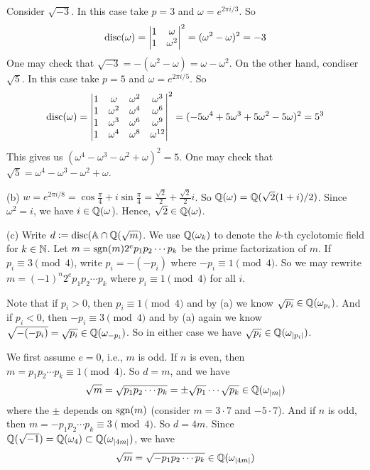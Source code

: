 \documentclass[../Marcus.tex]{subfiles}
\begin{document}
Consider $\sqrt{-3}$. In this case take $p=3$ and $\omega=e^{2\pi i/3}$. So
$$
\operatorname{disc}(\omega)=
\begin{vmatrix}
    1 & \omega \\
    1 & \omega^2
\end{vmatrix}^2
=(\omega^2-\omega)^2=-3
$$
One may check that $\sqrt{-3}=-(\omega^2-\omega)=\omega-\omega^2$.
On the other hand, condiser $\sqrt{5}$. In this case take $p=5$ and $\omega=e^{2\pi i/5}$. So
$$\operatorname{disc}(\omega)=
\begin{vmatrix}
    1 & \omega & \omega^2 & \omega^3 \\
    1 & \omega^2 & \omega^4 & \omega^6 \\
    1 & \omega^3 & \omega^6 & \omega^9 \\
    1 & \omega^4 & \omega^8 & \omega^{12} 
\end{vmatrix}^2
=(-5\omega^4+5\omega^3+5\omega^2-5\omega)^2=5^3
$$
This gives us $(\omega^4-\omega^3-\omega^2+\omega)^2=5$. One may check that $\sqrt{5}=\omega^4-\omega^3-\omega^2+\omega$.

(b) $w=e^{2\pi i/8}=\cos\frac{\pi}{4}+i\sin\frac{\pi}{4}=\frac{\sqrt{2}}{2}+\frac{\sqrt{2}}{2}i$. So $\mathbb{Q}(\omega)=\mathbb{Q}(\sqrt{2}(1+i)/2)$. Since $\omega^2=i$, we have $i\in\mathbb{Q}(\omega$). Hence, $\sqrt{2}\in\mathbb{Q}(\omega)$. 

(c) Write $d:=\operatorname{disc}(\mathbb{A}\cap\mathbb{Q}(\sqrt{m})$. We use $\mathbb{Q}(\omega_k)$ to denote the $k$-th cyclotomic field for $k\in\mathbb{N}$. Let $m=\operatorname{sgn}(m)2^ep_1p_2\cdots p_k$ be the prime factorization of $m$. If $p_i\equiv 3 \pmod{4}$, write $p_i=-(-p_i)$ where $-p_i\equiv 1 \pmod{4}$. So we may rewrite $m=(-1)^n2^ep_1p_2\cdots p_k$ where $p_i\equiv 1 \pmod{4}$ for all $i$.

Note that if $p_i>0$, then $p_i\equiv 1 \pmod{4}$ and by (a) we know $\sqrt{p_i}\in\mathbb{Q}(\omega_{p_i})$. And if $p_i<0$, then $-p_i\equiv 3 \pmod{4}$ and by (a) again we know $\sqrt{-(-p_i)}=\sqrt{p_i} \in\mathbb{Q}(\omega_{-p_i})$. So in either case we have $\sqrt{p_i}\in\mathbb{Q}(\omega_{|p_i|})$.

We first assume $e=0$, i.e., $m$ is odd. If $n$ is even, then $m=p_1p_2\cdots p_k\equiv 1 \pmod{4}$. So $d=m$, and we have
$$\sqrt{m}=\sqrt{p_1p_2\cdots p_k}=\pm \sqrt{p_1}\cdots \sqrt{p_k}\in\mathbb{Q}(\omega_{|m|})$$ where the $\pm$ depends on $\operatorname{sgn}(m)$ (consider $m=3\cdot7$ and $-5\cdot7$). And if $n$ is odd, then $m=-p_1p_2\cdots p_k\equiv 3 \pmod{4}$. So $d=4m$. Since $\mathbb{Q}(\sqrt{-1})=\mathbb{Q}(\omega_4)\subset\mathbb{Q}(\omega_{|4m|})$, we have $$\sqrt{m}=\sqrt{-p_1p_2\cdots p_k}\in\mathbb{Q}(\omega_{|4m|})$$
\end{document}
